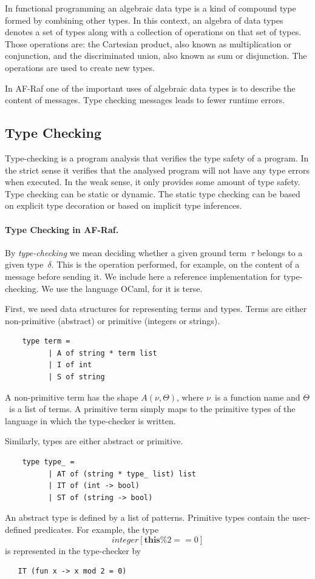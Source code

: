 \documentclass[a4paper,12pt,oneside,fleqn]{book} %
\begin{document}
{In functional programming an algebraic data type is a kind of compound type
formed by combining other types. In this context, an algebra of data types
denotes a set of types along with a collection of operations on that set of
types. Those operations are: the Cartesian product, also known as
multiplication or conjunction, and the discriminated union, also known as
sum or disjunction. The operations are used to create new types.

In AF-Raf one of the important uses of algebraic data types is to describe
the content of messages. Type checking messages leads to fewer runtime
errors.

\subsection{Type Checking}\label{sec:concepts-adt-check} %
Type-checking is a program analysis that verifies the type safety of a
program. In the strict sense it verifies that the analysed program
will not have any type errors when executed. In the weak sense, it only
provides some amount of type safety. Type checking can be static or
dynamic. The static type checking can be based on explicit type decoration
or based on implicit type inferences.


\paragraph{Type Checking in AF-Raf.}
By \emph{type-checking} we mean deciding whether a given ground term~$\tau$
belongs to a given type~$\delta$. This is the operation performed, for
example, on the content of a message before sending it. We include here a
reference implementation for type-checking. We use the language OCaml, for
it is terse.

First, we need data structures for representing terms and types. Terms are
either non-primitive (abstract) or primitive (integers or strings).
\begin{verbatim}
    type term =
          | A of string * term list
          | I of int
          | S of string
\end{verbatim}
A non-primitive term has the shape $A(\nu,\Theta)$, where $\nu$~is a
function name and $\Theta$~is a list of terms. A primitive term simply maps
to the primitive types of the language in which the type-checker is
written.

Similarly, types are either abstract or primitive.
\begin{verbatim}
    type type_ =
          | AT of (string * type_ list) list
          | IT of (int -> bool)
          | ST of (string -> bool)
\end{verbatim}
An abstract type is defined by a list of patterns. Primitive types contain the
user-defined predicates. For example, the type
\[\mathit{integer}[\mathbf{this}\%2==0]\] is represented in the type-checker by
\begin{verbatim}
   IT (fun x -> x mod 2 = 0)
\end{verbatim}

}
\end{document}
